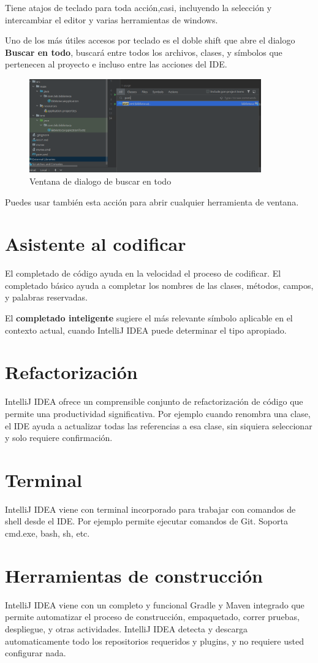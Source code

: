 Tiene atajos de teclado para toda acción,casi, incluyendo la selección y intercambiar el editor y varias herramientas de windows. 

Uno de los más útiles accesos por teclado es el doble shift que abre el dialogo \textbf{Buscar en todo}, buscará entre todos los archivos, clases, y símbolos que pertenecen al proyecto e incluso entre las acciones del IDE. 
\begin{figure}[h]
\centering
\includegraphics[width=10cm]{images/idea3}
\caption{Ventana de dialogo de buscar en todo}
\end{figure}
Puedes usar también esta acción para abrir cualquier herramienta de ventana. 

\section{Asistente al codificar}
El completado de código ayuda en la velocidad el proceso de codificar. El completado básico ayuda a completar los nombres de las clases, métodos, campos, y palabras reservadas.

El \textbf{completado inteligente} sugiere el más relevante símbolo aplicable en el contexto actual, cuando IntelliJ IDEA puede determinar el tipo apropiado. 
\section{Refactorización}
IntelliJ IDEA ofrece un comprensible conjunto de refactorización de código que permite una productividad significativa. Por ejemplo cuando renombra una clase, el IDE ayuda a actualizar todas las referencias a esa clase, sin siquiera seleccionar y solo requiere confirmación. 
\section{Terminal}
IntelliJ IDEA viene con terminal incorporado para trabajar con comandos de shell desde el IDE. Por ejemplo permite ejecutar comandos de Git. Soporta cmd.exe, bash, sh, etc. 
\section{Herramientas de construcción}
IntelliJ IDEA viene con un completo y funcional Gradle y Maven integrado que permite automatizar el proceso de construcción, empaquetado, correr pruebas, despliegue, y otras actividades. IntelliJ IDEA detecta y descarga automaticamente todo los repositorios requeridos y plugins, y no requiere usted configurar nada. 
